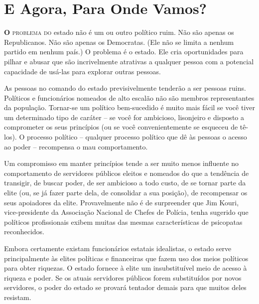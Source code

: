 
\chapter{E Agora, Para Onde Vamos?}
\label{chap:6}

\lettrine[lines=2]{\textcolor{LettrineColor}{\textbf{O}}}{ problema do} estado não é um ou outro político ruim. Não são apenas os Republicanos. Não são apenas os Democratas. (Ele não se limita a nenhum partido em nenhum país.) O problema é o estado. Ele cria oportunidades para pilhar e abusar que são incrivelmente atrativas a qualquer pessoa com a potencial capacidade de usá-las para explorar outras pessoas.

As pessoas no comando do estado previsivelmente tenderão a ser pessoas ruins. Políticos e funcionários nomeados de alto escalão não são membros representantes da população. Tornar-se um político bem-sucedido é muito mais fácil se você tiver um determinado tipo de caráter -- se você for ambicioso, lisonjeiro e disposto a comprometer os seus princípios (ou se você convenientemente se esqueceu de tê-los). O processo político -- qualquer processo político que dê às pessoas o acesso ao poder -- recompensa o mau comportamento.

Um compromisso em manter princípios tende a ser muito menos influente no comportamento de servidores públicos eleitos e nomeados do que a tendência de transigir, de buscar poder, de ser ambicioso a todo custo, de se tornar parte da elite (ou, se já fazer parte dela, de consolidar a sua posição), de recompensar os seus apoiadores da elite. Provavelmente não é de surpreender que Jim Kouri, vice-presidente da Associação Nacional de Chefes de Polícia, tenha sugerido que políticos profissionais exibem muitas das mesmas características de psicopatas reconhecidos.

Embora certamente existam funcionários estatais idealistas, o estado serve principalmente às elites políticas e financeiras que fazem uso dos meios políticos para obter riquezas. O estado fornece à elite um insubstituível meio de acesso à riqueza e poder. Se os atuais servidores públicos forem substituídos por novos servidores, o poder do estado se provará tentador demais para que muitos deles resistam.

